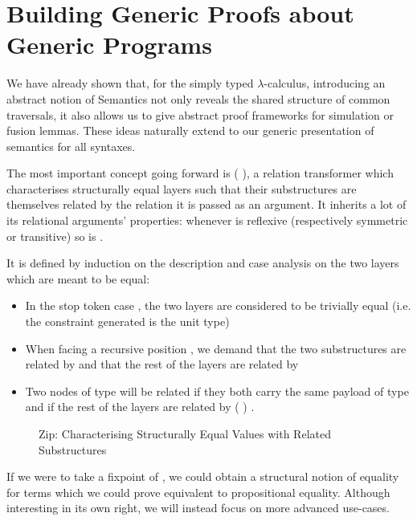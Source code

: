 

\chapter{Building Generic Proofs about Generic Programs}

We have already shown that, for the simply typed $\lambda$-calculus, introducing an
abstract notion of Semantics not only reveals the shared structure of common
traversals, it also allows us to give abstract proof frameworks for
simulation or fusion lemmas. These ideas naturally extend to our generic
presentation of semantics for all syntaxes.

The most important concept going forward is ( ), a relation
transformer which characterises structurally equal layers such that their
substructures are themselves related by the relation it is passed as an
argument. It inherits a lot of its relational arguments' properties: whenever
 is reflexive (respectively symmetric or transitive) so is {  }.\label{lem:zipstable}

It is defined by induction on the description and case analysis on the two
layers which are meant to be equal:
\begin{itemize}
  \item In the stop token case  , the two layers are considered to
    be trivially equal (i.e. the constraint generated is the unit type)
  \item When facing a recursive position { \AB{$\Delta$}  }, we
    demand that the two substructures are related by { \AB{$\Delta$} }
    and that the rest of the layers are related by   
  \item Two nodes of type {  } will
    be related if they both carry the same payload  of type  and if
    the rest of the layers are related by { ( ) }.
\end{itemize}

\begin{figure}[h]
\caption{Zip: Characterising Structurally Equal Values with Related Substructures}
\end{figure}

If we were to take a fixpoint of , we could obtain a structural
notion of equality for terms which we could prove equivalent to propositional
equality. Although interesting in its own right, we will instead focus on more
advanced use-cases.

